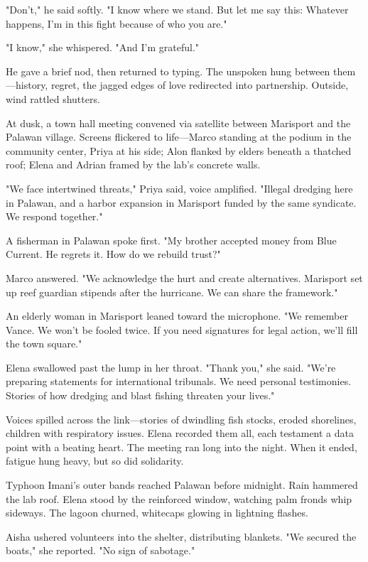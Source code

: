 "Don't," he said softly. "I know where we stand. But let me say this: Whatever happens, I'm in this fight because of who you are."

"I know," she whispered. "And I'm grateful."

He gave a brief nod, then returned to typing. The unspoken hung between them—history, regret, the jagged edges of love redirected into partnership. Outside, wind rattled shutters.

\bigskip

At dusk, a town hall meeting convened via satellite between Marisport and the Palawan village. Screens flickered to life—Marco standing at the podium in the community center, Priya at his side; Alon flanked by elders beneath a thatched roof; Elena and Adrian framed by the lab's concrete walls.

"We face intertwined threats," Priya said, voice amplified. "Illegal dredging here in Palawan, and a harbor expansion in Marisport funded by the same syndicate. We respond together."

A fisherman in Palawan spoke first. "My brother accepted money from Blue Current. He regrets it. How do we rebuild trust?"

Marco answered. "We acknowledge the hurt and create alternatives. Marisport set up reef guardian stipends after the hurricane. We can share the framework."

An elderly woman in Marisport leaned toward the microphone. "We remember Vance. We won't be fooled twice. If you need signatures for legal action, we'll fill the town square."

Elena swallowed past the lump in her throat. "Thank you," she said. "We're preparing statements for international tribunals. We need personal testimonies. Stories of how dredging and blast fishing threaten your lives."

Voices spilled across the link—stories of dwindling fish stocks, eroded shorelines, children with respiratory issues. Elena recorded them all, each testament a data point with a beating heart. The meeting ran long into the night. When it ended, fatigue hung heavy, but so did solidarity.

\bigskip

Typhoon Imani's outer bands reached Palawan before midnight. Rain hammered the lab roof. Elena stood by the reinforced window, watching palm fronds whip sideways. The lagoon churned, whitecaps glowing in lightning flashes.

Aisha ushered volunteers into the shelter, distributing blankets. "We secured the boats," she reported. "No sign of sabotage."

